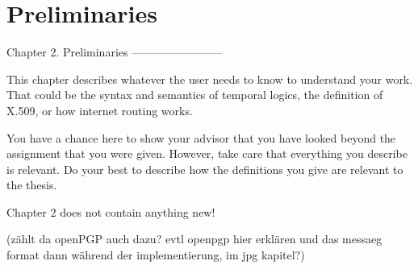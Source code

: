 \chapter{Preliminaries}

Chapter 2. Preliminaries
------------------------

This chapter describes whatever the user needs to know to
understand your work. That could be the syntax and semantics of
temporal logics, the definition of X.509, or how internet routing
works.

You have a chance here to show your advisor that you have looked
beyond the assignment that you were given. However, take care that
everything you describe is relevant. Do your best to describe how
the definitions you give are relevant to the thesis.

Chapter 2 does not contain anything new!



(zählt da openPGP auch dazu? 
evtl openpgp hier erklären und das messaeg format dann während der implementierung, im jpg kapitel?)